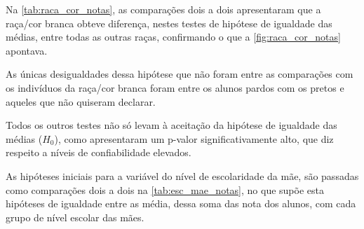 Na \autoref{tab:raca_cor_notas}, as comparações dois a dois apresentaram que a raça/cor branca obteve diferença,
nestes testes de hipótese de igualdade das médias, entre todas as outras raças, confirmando o que a 
\autoref{fig:raca_cor_notas} apontava.

As únicas desigualdades dessa hipótese que não foram entre as comparações com os indivíduos da raça/cor branca
foram entre os alunos pardos com os pretos e aqueles que não quiseram declarar.

Todos os outros testes não só levam à aceitação da hipótese de igualdade das médias ($H_0$), como apresentaram um p-valor
significativamente alto, que diz respeito a níveis de confiabilidade elevados.


As hipóteses iniciais para a variável do nível de escolaridade da mãe, são passadas como comparações dois a dois na \autoref{tab:esc_mae_notas},
no que supõe esta hipóteses de igualdade entre as média, dessa soma das nota dos alunos, com cada grupo de nível escolar das mães.
\newpage

